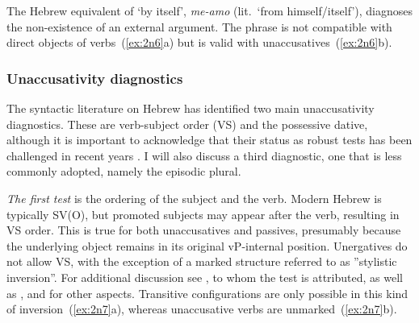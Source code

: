 \begin{exe}
\begin{xlist}
\begin{exe}
\begin{xlist}
\begin{exe}
\begin{xlist}
\begin{exe}
\begin{exe}
\begin{xlist}
		
 \z
\z 	

The Hebrew equivalent of `by itself', \emph{me-a{\ts}mo} (lit.~`from himself/itself'), diagnoses the non-existence of an external argument. The phrase is not compatible with direct objects of  verbs~(\ref{ex:2n6}a) but is valid with unaccusatives~(\ref{ex:2n6}b).
 \begin{exe}
 \ex  \label{ex:2n6}
 \begin{xlist} 
		
		
 \z
\z 


		\subsubsection{Unaccusativity diagnostics} \label{voice:tkal:nact:unacc}
The syntactic literature on Hebrew has identified two main unaccusativity diagnostics. These are verb-subject order (VS) and the possessive dative, although it is important to acknowledge that their status as robust tests has been challenged in recent years \citep{gafter14li,linzen14pd,kastner17gjgl}. I will also discuss a third diagnostic, one that is less commonly adopted, namely the episodic plural.

\textit{The first test} is the ordering of the subject and the verb. Modern Hebrew is typically SV(O), but promoted subjects may appear after the verb, resulting in VS order. This is true for both unaccusatives and passives, presumably because the underlying object remains in its original vP-internal position. Unergatives do not allow VS, with the exception of a marked structure referred to as ''stylistic inversion''. For additional discussion see \cite{shlonsky87}, to whom the test is attributed, as well as \cite{shlonskydoron91}, \cite{borer95} and \cite{preminger10} for other aspects. Transitive configurations are only possible in this kind of inversion~(\ref{ex:2n7}a), whereas unaccusative verbs are unmarked~(\ref{ex:2n7}b).


\end{xlist}
\end{exe}
\end{xlist}
\end{exe}
\end{exe}
\end{xlist}
\end{exe}
\end{xlist}
\end{exe}
\end{xlist}
\end{exe}
